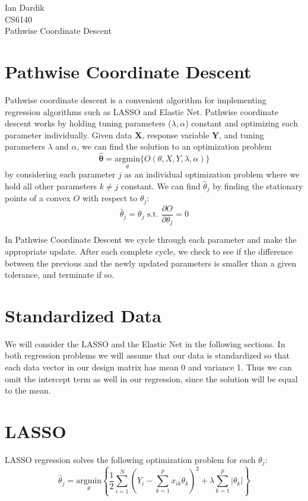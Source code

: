 \documentclass[12pt]{article}
\newcommand{\bY}{\mathbf{Y}}
\newcommand{\bX}{\mathbf{X}}
\newcommand{\thh}{\hat{\theta}}
\begin{document}
\noindent Ian Dardik \\
\noindent CS6140 \\
\noindent Pathwise Coordinate Descent

\section{Pathwise Coordinate Descent}
Pathwise coordinate descent is a convenient algorithm for implementing regression algorithms such as LASSO and Elastic Net.  Pathwise coordinate descent works by holding tuning parameters ($\lambda, \alpha$) constant and optimizing each parameter individually\cite{ht}.  Given data $\bX$, response variable $\bY$, and tuning parameters $\lambda$ and $\alpha$, we can find the solution to an optimization problem
	$$\mathbf{\thh} = \underset{\theta}{\text{argmin}}\{O(\theta,X,Y,\lambda,\alpha)\}$$
by considering each parameter $j$ as an individual optimization problem where we hold all other parameters $k \ne j$ constant.  We can find $\thh_j$ by finding the stationary points of a convex $O$ with respect to $\theta_j$:
	$$\thh_j = \theta_j \text{ s.t. } \frac{\partial O}{\partial \theta_j} = 0$$

In Pathwise Coordinate Descent we cycle through each parameter and make the appropriate update.  After each complete cycle, we check to see if the difference between the previous and the newly updated parameters is smaller than a given tolerance, and terminate if so.  


\section{Standardized Data}
We will consider the LASSO and the Elastic Net in the following sections.  In both regression problems we will assume that our data is standardized so that each data vector in our design matrix has mean 0 and variance 1.  Thus we can omit the intercept term as well in our regression, since the solution will be equal to the mean\cite{ht}.  


\section{LASSO}
LASSO regression solves the following optimization problem for each $\theta_j$\cite{ht}:
	$$\thh_j = \underset{\theta}{\text{argmin}}\left\{ \frac{1}{2} \sum\limits_{i=1}^N \left(Y_i - \sum\limits_{k=1}^px_{ik}\theta_k \right)^2 + \lambda \sum\limits_{k=1}^p|\theta_k| \right\}$$
\end{document}
